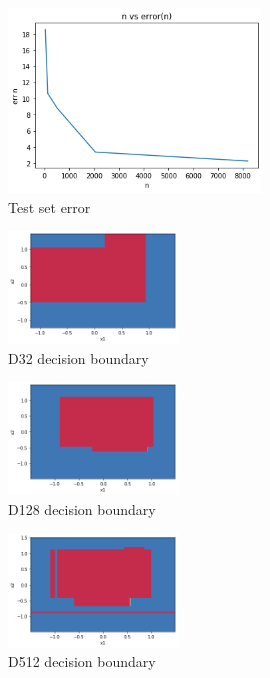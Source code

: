 \documentclass[a4paper]{article}
\theoremstyle{definition}
\newenvironment{soln}{
    \leavevmode\color{blue}\ignorespaces
}{}
\begin{document}
\begin{enumerate}
\begin{soln}
	\begin{figure}[h!]
	        \centering
	        \includegraphics[width=0.6\textwidth]{errorvsn.png} 
	        \captionsetup{labelformat=empty}
	        \caption{Test set error}
	        \label{fig:Test set error}
	  \end{figure}
	
	\begin{figure}[h!]
	        \centering
	        \includegraphics[width=0.4\textwidth]{71.png} 
	        \captionsetup{labelformat=empty}
	        \caption{D32 decision boundary}
	        \label{fig:D32 boundary}
	  \end{figure}	

	\begin{figure}[h!]
	        \centering
	        \includegraphics[width=0.4\textwidth]{72.png} 
	        \captionsetup{labelformat=empty}
	        \caption{D128 decision boundary}
	        \label{fig:D128 boundary}
	  \end{figure}

	\begin{figure}[h!]
	        \centering
	        \includegraphics[width=0.4\textwidth]{73.png} 
	        \captionsetup{labelformat=empty}
	        \caption{D512 decision boundary}
	        \label{fig:D512 boundary}
	  \end{figure}


\end{soln}
\end{enumerate}
\end{document}
